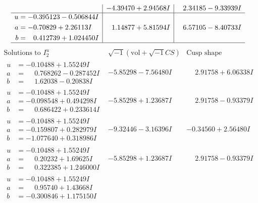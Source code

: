 \documentclass[1p]{elsarticle_modified}
\theoremstyle{definition}
\newcommand{\I}{\sqrt{-1}}
\begin{document}
$$\begin{array}{c|c|c}
 & -4.39470 + 2.94568 I & \phantom{-}2.34185 - 9.33939 I \\ \hline\begin{aligned}
u &= -0.395123 - 0.506844 I \\
a &= -0.70829 + 2.26113 I \\
b &= \phantom{-}0.412739 + 1.024450 I\end{aligned}
 & \phantom{-}1.14877 + 5.81594 I & \phantom{-}6.57105 - 8.40733 I\\
 \hline 
 \end{array}$$\newpage$$\begin{array}{c|c|c}  
\text{Solutions to }I^u_{2}& \I (\text{vol} + \sqrt{-1}CS) & \text{Cusp shape}\\
 \hline 
\begin{aligned}
u &= -0.10488 + 1.55249 I \\
a &= \phantom{-}0.768262 - 0.287452 I \\
b &= \phantom{-}1.62038 - 0.20838 I\end{aligned}
 & -5.85298 - 7.56480 I & \phantom{-}2.91758 + 6.06338 I \\ \hline\begin{aligned}
u &= -0.10488 + 1.55249 I \\
a &= -0.098548 + 0.494298 I \\
b &= \phantom{-}0.686422 + 0.233614 I\end{aligned}
 & -5.85298 + 1.23687 I & \phantom{-}2.91758 - 0.93379 I \\ \hline\begin{aligned}
u &= -0.10488 + 1.55249 I \\
a &= -0.159807 + 0.282979 I \\
b &= -1.077640 + 0.318986 I\end{aligned}
 & -9.32446 - 3.16396 I & -0.34560 + 2.56480 I \\ \hline\begin{aligned}
u &= -0.10488 + 1.55249 I \\
a &= \phantom{-}0.20232 + 1.69625 I \\
b &= \phantom{-}0.322385 + 1.246000 I\end{aligned}
 & -5.85298 + 1.23687 I & \phantom{-}2.91758 - 0.93379 I \\ \hline\begin{aligned}
u &= -0.10488 + 1.55249 I \\
a &= \phantom{-}0.95740 + 1.43668 I \\
b &= -0.300846 + 1.175150 I\end{aligned}

\end{array}$$
\end{document}
